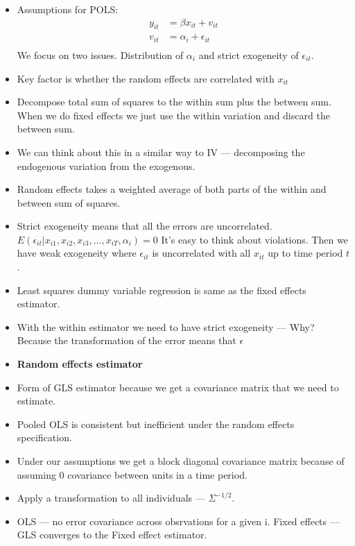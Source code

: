 \documentclass[12pt]{article}
\begin{document}
\begin{itemize}
      \item Assumptions for POLS:
            \begin{align*}
                  y_{it} & = \beta x_{it} + v_{it}    \\
                  v_{it} & = \alpha_i + \epsilon_{it} \\
            \end{align*}
            We focus on two issues. Distribution of $\alpha_i$ and strict exogeneity of $\epsilon_{it}$.
      \item Key factor is whether the random effects are correlated with $x_{it}$
      \item Decompose total sum of squares to the within sum plus the between sum. When we do fixed effects we just use the within variation and discard the between sum.
      \item We can think about this in a similar way to IV --- decomposing the endogenous variation from the exogenous.
      \item Random effects takes a weighted average of both parts of the within and between sum of squares.
      \item Strict exogeneity means that all the errors are uncorrelated. $E(\epsilon_{it}|x_{i1}, x_{i2}, x_{i3}, ..., x_{iT}, \alpha_i) = 0$
            It's easy to think about violations.
            Then we have weak exogeneity where $\epsilon_{it}$ is uncorrelated with all $x_{it}$ up to time period $t$.
      \item Least squares dummy variable regression is same as the fixed effects estimator.
      \item With the within estimator we need to have strict exogeneity --- Why? Because the transformation of the error means that $\epsilon$
      \item \textbf{Random effects estimator}
      \item Form of GLS estimator because we get a covariance matrix that we need to estimate.
      \item Pooled OLS is consistent but inefficient under the random effects specification.
      \item Under our assumptions we get a block diagonal covariance matrix because of assuming 0 covariance between units in a time period.
      \item Apply a transformation to all individuals --- $\Sigma^{-1/2}$.
      \item OLS --- no error covariance across obsrvations for a given i. Fixed effects --- GLS converges to the Fixed effect estimator. \\

\end{itemize}
\end{document}

